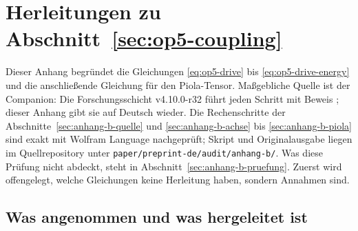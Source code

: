 \clearpage
\section{Herleitungen zu Abschnitt~\ref{sec:op5-coupling}}
\label{sec:anhang-b}

Dieser Anhang begründet die Gleichungen \eqref{eq:op5-drive} bis \eqref{eq:op5-drive-energy} und die anschließende Gleichung für den
Piola-Tensor. Maßgebliche Quelle ist der Companion: Die Forschungsschicht v4.10.0-r32 führt jeden Schritt mit Beweis
\cite{layers,repo}; dieser Anhang gibt sie auf Deutsch wieder. Die Rechenschritte der Abschnitte~\ref{sec:anhang-b-quelle} und
\ref{sec:anhang-b-achse} bis \ref{sec:anhang-b-piola} sind exakt mit Wolfram Language nachgeprüft; Skript und Originalausgabe liegen im Quellrepository
unter \texttt{paper/\allowbreak preprint-de/\allowbreak audit/\allowbreak anhang-b/}. Was diese Prüfung nicht abdeckt, steht in
Abschnitt~\ref{sec:anhang-b-pruefung}. Zuerst wird offengelegt, welche Gleichungen keine Herleitung haben, sondern Annahmen
sind.

\subsection{Was angenommen und was hergeleitet ist}
\label{sec:anhang-b-annahmen}

